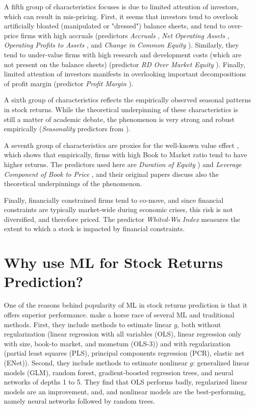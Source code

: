 			A fifth group of characteristics focuses is due to limited attention of investors, which can result in mis-pricing. First, it seems that investors tend to overlook artificially bloated (manipulated or "dressed") balance sheets, and tend to over-price firms with high accruals (predictors \textit{Accruals} \citep{sloan1996create}, \textit{Net Operating Assets} \citep{hirshleifer2004investors}, \textit{Operating Profits to Assets} \citep{ball2016accruals}, and \textit{Change in Common Equity} \cite{richardson2006implications}). Similarly, they tend to under-value firms with high research and development costs (which are not present on the balance sheets) (predictor \textit{ RD Over Market Equity} \cite{chan2001stock}). Finally, limited attention of investors manifests in overlooking important decompositions of profit margin (predictor \textit{Profit Margin} \cite{soliman2008use}).
			
			A sixth group of characteristics reflects the empirically observed seasonal patterns in stock returns. While the theoretical underpinning of these characteristics is still a matter of academic debate, the phenomenon is very strong and robust empirically (\textit{Seasonality} predictors from \cite{heston2008seasonality}). 
 			
 			A seventh group of characteristics are proxies for the well-known value effect \cite{fama1993common}, which shows that empirically, firms with high Book to Market ratio tend to have higher returns. The predictors used here are \textit{ Duration of Equity }\citep{dechow2004implied}) and \textit{Leverage Component of Book to Price} \citep{penman2007book}, and their original papers discuss also the theoretical underpinnings of the phenomenon.
 			
 			Finally, financially constrained firms tend to co-move, and since financial constraints are typically market-wide during economic crises, this risk is not diversified, and therefore priced. The predictor \textit{Whited-Wu Index} \citep{whited2006financial} measures the extent to which a stock is impacted by financial constraints.  
			
				
		\section{Why use ML for Stock Returns Prediction?}
			
			One of the reasons behind popularity of ML in stock returns prediction is that it offers superior performance. \cite{gu2020empirical} make a horse race of several ML and traditional methods. First, they include methods to estimate linear $g$, both without regularization (linear regression with all variables (OLS), linear regression only with size, book-to market, and mometum (OLS-3)) and with regularization (partial least squares (PLS), principal components regression (PCR), elastic net (ENet)). Second, they include methods to estimate nonlinear $g$: generalized linear models (GLM), random forest, gradient-boosted regression trees, and neural networks of depths 1 to 5. They find that OLS performs badly, regularized linear models are an improvement, and, and nonlinear models are the best-performing, namely neural networks followed by random trees. 
			
